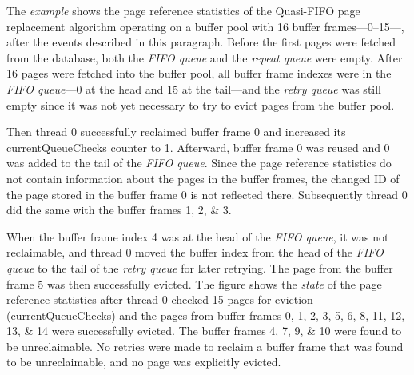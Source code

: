     The \emph{example} shows the page reference statistics of the Quasi-FIFO page replacement algorithm operating on a buffer pool with \num{16} buffer frames---\numrange{0}{15}---, after the events described in this paragraph. Before the first pages were fetched from the database, both the \textit{FIFO queue} and the \textit{repeat queue} were empty. After \num{16} pages were fetched into the buffer pool, all buffer frame indexes were in the \textit{FIFO queue}---0 at the head and 15 at the tail---and the \textit{retry queue} was still empty since it was not yet necessary to try to evict pages from the buffer pool.

    Then thread 0 successfully reclaimed buffer frame 0 and increased its currentQueueChecks counter to \num{1}. Afterward, buffer frame 0 was reused and 0 was added to the tail of the \textit{FIFO queue}. Since the page reference statistics do not contain information about the pages in the buffer frames, the changed ID of the page stored in the buffer frame 0 is not reflected there. Subsequently thread 0 did the same with the buffer frames \numlist{1;2;3}.

    When the buffer frame index 4 was at the head of the \textit{FIFO queue}, it was not reclaimable, and thread 0 moved the buffer index from the head of the \textit{FIFO queue} to the tail of the \textit{retry queue} for later retrying. The page from the buffer frame 5 was then successfully evicted. The figure shows the \emph{state} of the page reference statistics after thread 0 checked \num{15} pages for eviction (currentQueueChecks) and the pages from buffer frames \numlist{0;1;2;3;5;6;8;11;12;13;14} were successfully evicted. The buffer frames \numlist{4;7;9;10} were found to be unreclaimable. No retries were made to reclaim a buffer frame that was found to be unreclaimable, and no page was explicitly evicted.

